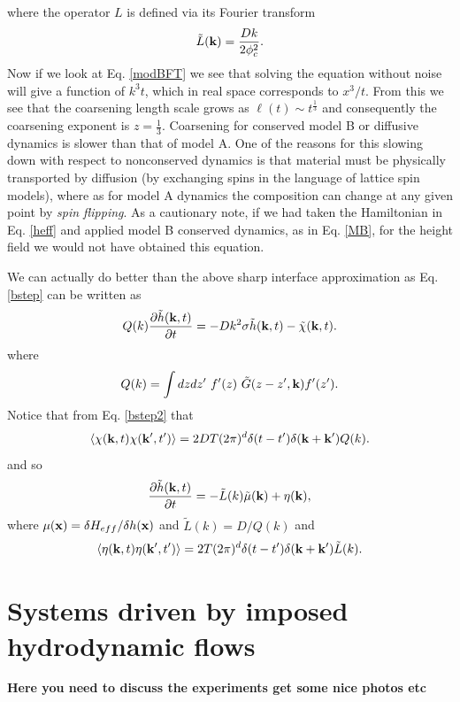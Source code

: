 where the operator $L$ is defined via its Fourier transform
\begin{equation}
\tilde L({\bf k}) = \frac{Dk}{2\phi_c^2}.
\end{equation}
Now if we look at Eq. \eqref{modBFT} we see that solving the equation without noise will give a function of $k^3t$, which in real space corresponds to $x^3/t$. From this we see that the coarsening length scale grows as $\ell(t) \sim t^{\frac{1}{3}}$ and consequently the coarsening exponent is $z=\frac{1}{3}$.  Coarsening for conserved model B or diffusive dynamics is slower than that of model A. One of the reasons for this slowing down with respect to nonconserved dynamics is that material must be physically transported by diffusion (by exchanging spins in the language of lattice spin models), where as for  model A dynamics the composition can change at any given point by {\em spin flipping}. As a cautionary note, if we had taken the
Hamiltonian in Eq. \eqref{heff} and applied model B conserved dynamics, as in Eq. \eqref{MB},  for the height field we would not have obtained this equation. 

We can actually do better than the above sharp interface approximation as Eq. \eqref{bstep} can be written as
\begin{equation}
Q(k)\frac{\partial\tilde h({\bf k},t)}{\partial t} = 
-Dk^2\sigma \tilde h({\bf k},t) - \tilde \chi({\bf k},t).\label{bstep2}
\end{equation}
where 
\begin{equation}
Q(k)= \int dzdz' \ f'(z)\ \tilde G(z-z',{\bf k}) f'(z').
\end{equation}
Notice that from Eq. \eqref{bstep2} that
\begin{equation}
\langle \chi({\bf k},t)\chi({\bf k}',t')\rangle  = 2DT(2\pi)^d \delta(t-t') \delta({\bf k}+{\bf k'}) Q(k).\end{equation}
and so 
\begin{equation}
\frac{\partial\tilde h({\bf k},t)}{\partial t}= -\tilde L(k) \tilde \mu({\bf k}) + \eta({\bf k}),
\end{equation}
where $\mu({\bf x})=\delta H_{eff}/\delta h({\bf x}) $ and $\tilde L(k) = D/Q(k)$ and 
\begin{equation}
\langle \eta({\bf k},t)\eta({\bf k}',t')\rangle  = 2T(2\pi)^d \delta(t-t') \delta({\bf k}+{\bf k'}) \tilde L(k).\end{equation}
\section{Systems driven by imposed hydrodynamic flows}
{\bf Here you need to discuss the experiments get some nice photos etc}

